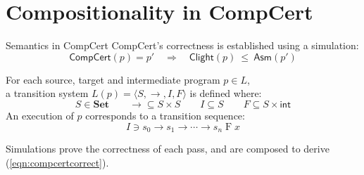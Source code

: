 \documentclass[aspectratio=1610,12pt]{beamer}
\begin{document}
\section{Compositionality in CompCert}
\frame{\sectionpage}

\begin{frame}{Semantics in CompCert} %
  CompCert's correctness is established using a simulation:
  \begin{equation}
    \mathsf{CompCert}(p) = p' \quad\Longrightarrow\quad
    \mathsf{Clight}(p) \:\le\: \mathsf{Asm}(p') %
    \label{eqn:compcertcorrect}
  \end{equation}

  \vfill
  For each source, target and intermediate program $p \in L$, \\
  a transition system
  $L(p) = \langle S, {\rightarrow}, I, F \rangle$ is defined where:
  \[
    S \in \mathbf{Set} \qquad
    {\rightarrow} \subseteq S \times S \qquad
    I \subseteq S \qquad
    F \subseteq S \times \mathsf{int}
  \]
  An execution of $p$ corresponds to a transition sequence:
  \[
    I \ni s_0 \rightarrow s_1 \rightarrow \cdots \rightarrow s_n \mathrel{F} x
  \]

  \vfill
  Simulations prove the correctness of each pass,
  and are composed to derive (\ref{eqn:compcertcorrect}).
\end{frame}
\end{document}
